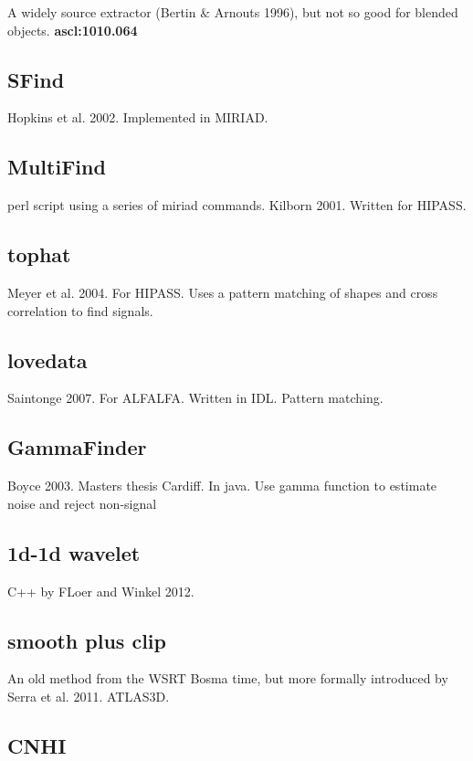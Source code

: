 \documentclass[preprint]{aastex} %
\begin{document}
A widely source extractor (Bertin \& Arnouts 1996), but not so good for blended objects.
{\bf ascl:1010.064}

\subsection{SFind}

Hopkins et al. 2002.   Implemented in MIRIAD.

\subsection{MultiFind}

perl script using a series of miriad commands. Kilborn 2001. Written for HIPASS.

\subsection{tophat}

Meyer et al. 2004. For HIPASS. Uses a pattern matching of shapes and cross correlation
to find signals.

\subsection{lovedata}

Saintonge 2007. For ALFALFA. Written in IDL. Pattern matching.


\subsection{GammaFinder}

Boyce 2003. Masters thesis Cardiff.  In java. Use gamma function to estimate
noise and reject non-signal

\subsection{1d-1d wavelet}

C++ by FLoer and Winkel 2012.

\subsection{smooth plus clip}

An old method from the WSRT Bosma time, but more formally
introduced by Serra et al. 2011. ATLAS3D.

\subsection{CNHI}
\end{document}
